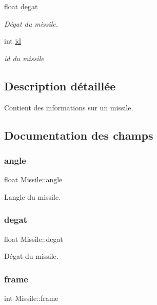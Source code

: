 \begin{DoxyCompactItemize}
float \hyperlink{struct_missile_a3343ee5a7eea3a8bb73305bb4208a25c}{degat}
\begin{DoxyCompactList}\small\item\em Dégat du missile. \end{DoxyCompactList}\item 
int \hyperlink{struct_missile_a358766d8b44976d02199119cbd3f0c2c}{id}
\begin{DoxyCompactList}\small\item\em id du missile \end{DoxyCompactList}\end{DoxyCompactItemize}


\subsection{Description détaillée}
Contient des informations sur un missile. 

\subsection{Documentation des champs}
\mbox{\label{struct_missile_a1f84bccb1c65efa95e4c30874ad4b655}} 
\subsubsection{\texorpdfstring{angle}{angle}}
{\footnotesize\ttfamily float Missile\+::angle}



L\textquotesingle{}angle du missile. 

\mbox{\label{struct_missile_a3343ee5a7eea3a8bb73305bb4208a25c}} 
\subsubsection{\texorpdfstring{degat}{degat}}
{\footnotesize\ttfamily float Missile\+::degat}



Dégat du missile. 

\mbox{\label{struct_missile_a6bdfd2d510a44beeff7a792bb3b54514}} 
\subsubsection{\texorpdfstring{frame}{frame}}
{\footnotesize\ttfamily int Missile\+::frame}



